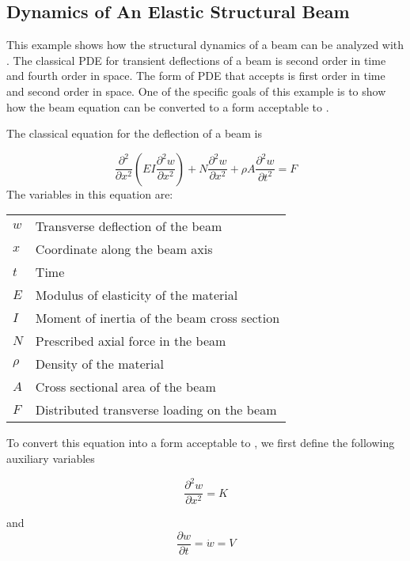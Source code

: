 \documentclass{article}
\begin{document}
\newpage
\subsection{Dynamics of An Elastic Structural Beam}
This example shows how the structural dynamics of a beam can be analyzed with
\pde. The classical PDE for transient deflections of a beam is second order 
in time and fourth order in space. The form of PDE that \pde accepts is
first order in time and second order in space. One of the specific goals of
this example is to show how the beam equation can be converted to a form
acceptable to \pde.

The classical equation for the deflection of a beam is 

\begin{equation}\label{eq_beam_pde}
	\frac{\partial^2}{\partial x^2}(EI\frac{\partial^2 w}{\partial x^2})
	+ N\frac{\partial^2 w}{\partial x^2}
	+ \rho A\frac{\partial^2 w}{\partial t^2} = F
\end{equation}
The variables in this equation are:

\begin{tabular}{ll}
	$w$ & Transverse deflection of the beam \\
	$x$ & Coordinate along the beam axis \\
	$t$ & Time \\
	$E$ & Modulus of elasticity of the material \\
	$I$ & Moment of inertia of the beam cross section \\
	$N$ & Prescribed axial force in the beam \\
	$\rho$ & Density of the material \\
	$A$ & Cross sectional area of the beam \\
	$F$ & Distributed transverse loading on the beam \\
\end{tabular}

To convert this equation into a form acceptable to \pde, we first define
the following auxiliary variables

\begin{equation}\label{eq_beam_moment}
	\frac{\partial^2 w}{\partial x^2} = K
\end{equation}

and
\begin{equation}\label{eq_beam_velocity}
	\frac{\partial w}{\partial t} = \dot w = V
\end{equation}
\end{document}
